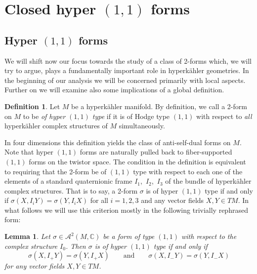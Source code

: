 \documentclass[11pt]{amsart}
\newtheorem{lemma}[theorem]{Lemma}
\theoremstyle{remark}
\theoremstyle{remark}
\theoremstyle{definition}
\newtheorem*{definition}{Definition}
\theoremstyle{definition}
\theoremstyle{definition}
\newcommand{\0}{{\scriptstyle 0'}} %
\newcommand{\1}{{\scriptstyle 1'}}
\begin{document}
\section{Closed hyper $(1,1)$ forms} \label{sec:Hyp-1,1}


\subsection{Hyper $(1,1)$ forms} \hfill \medskip


We will shift now our focus towards the study of a class of \mbox{2-forms} which, we will try to argue, plays a fundamentally important role in hyperk\"ahler geometries. In the beginning of our analysis we will be concerned primarily with local aspects. Further on we will examine also some implications of a global definition. 


\begin{definition}
Let $M$ be a hyperk\"ahler manifold. By definition, we call a 2-form on $M$ to be \textit{of hyper $(1,1)$ type} if it is of Hodge type $(1,1)$ with respect to \textit{all} hyperk\"ahler complex structures of $M$ simultaneously. 
\end{definition}

In four dimensions this definition yields the class of anti-self-dual forms on $M$.
Note that hyper $(1,1)$ forms are naturally pulled back to fiber-supported $(1,1)$ forms on the twistor space. 
The condition in the definition is equivalent to requiring that the 2-form be of $(1,1)$ type with respect to each one of the elements of a standard quaternionic frame \mbox{$I_1$, $I_2$, $I_3$} of the bundle of hyperk\"ahler complex structures. That is to say, a 2-form $\sigma$ is of hyper $(1,1)$ type if and only if $\sigma(X,I_iY) = \sigma(Y,I_iX)$ for all $i=1,2,3$ and any vector fields $X,Y \in TM$. In what follows we will use this criterion mostly in the following trivially rephrased form: 

\begin{lemma} \label{criterion_1}
Let $\sigma \in \mathscr{A}^2(M,\mathbb{C})$ be a form of type $(1,1)$ with respect to the complex structure $I_0$. Then $\sigma$ is of hyper $(1,1)$ type if and only if \begin{equation}
\sigma(X,I_+Y) = \sigma(Y,I_+X)
\qquad \text{and} \qquad
\sigma(X,I_-Y) = \sigma(Y,I_-X)
\end{equation}
for any vector fields $X,Y \in TM$.
\end{lemma}
\end{document}
